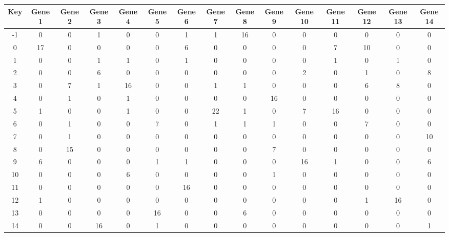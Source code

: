 \begin{tabular}{|c|c|c|c|c|c|c|c|c|c|c|c|c|c|c|}
\hline
Key & Gene 1 & Gene 2 & Gene 3 & Gene 4 & Gene 5 & Gene 6 & Gene 7 & Gene 8 & Gene 9 & Gene 10 & Gene 11 & Gene 12 & Gene 13 & Gene 14 \\
\hline
-1 & 0 & 0 & 1 & 0 & 0 & 1 & 1 & 16 & 0 & 0 & 0 & 0 & 0 & 0 \\
0 & 17 & 0 & 0 & 0 & 0 & 6 & 0 & 0 & 0 & 0 & 7 & 10 & 0 & 0 \\
1 & 0 & 0 & 1 & 1 & 0 & 1 & 0 & 0 & 0 & 0 & 1 & 0 & 1 & 0 \\
2 & 0 & 0 & 6 & 0 & 0 & 0 & 0 & 0 & 0 & 2 & 0 & 1 & 0 & 8 \\
3 & 0 & 7 & 1 & 16 & 0 & 0 & 1 & 1 & 0 & 0 & 0 & 6 & 8 & 0 \\
4 & 0 & 1 & 0 & 1 & 0 & 0 & 0 & 0 & 16 & 0 & 0 & 0 & 0 & 0 \\
5 & 1 & 0 & 0 & 1 & 0 & 0 & 22 & 1 & 0 & 7 & 16 & 0 & 0 & 0 \\
6 & 0 & 1 & 0 & 0 & 7 & 0 & 1 & 1 & 1 & 0 & 0 & 7 & 0 & 0 \\
7 & 0 & 1 & 0 & 0 & 0 & 0 & 0 & 0 & 0 & 0 & 0 & 0 & 0 & 10 \\
8 & 0 & 15 & 0 & 0 & 0 & 0 & 0 & 0 & 7 & 0 & 0 & 0 & 0 & 0 \\
9 & 6 & 0 & 0 & 0 & 1 & 1 & 0 & 0 & 0 & 16 & 1 & 0 & 0 & 6 \\
10 & 0 & 0 & 0 & 6 & 0 & 0 & 0 & 0 & 1 & 0 & 0 & 0 & 0 & 0 \\
11 & 0 & 0 & 0 & 0 & 0 & 16 & 0 & 0 & 0 & 0 & 0 & 0 & 0 & 0 \\
12 & 1 & 0 & 0 & 0 & 0 & 0 & 0 & 0 & 0 & 0 & 0 & 1 & 16 & 0 \\
13 & 0 & 0 & 0 & 0 & 16 & 0 & 0 & 6 & 0 & 0 & 0 & 0 & 0 & 0 \\
14 & 0 & 0 & 16 & 0 & 1 & 0 & 0 & 0 & 0 & 0 & 0 & 0 & 0 & 1 \\
\hline
\end{tabular}